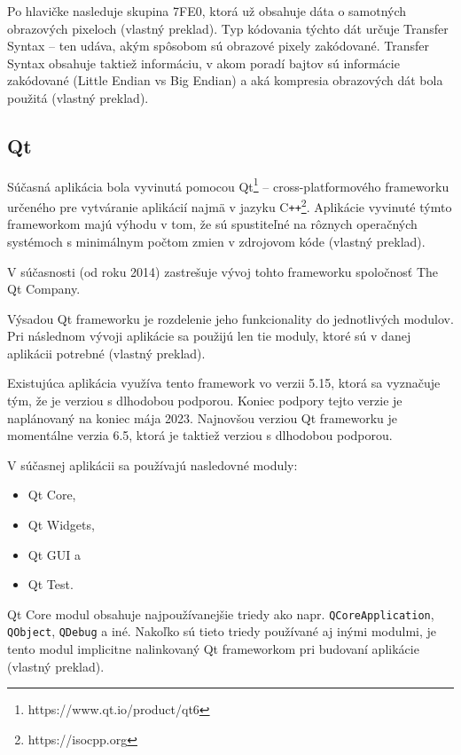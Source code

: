 Po hlavičke nasleduje skupina 7FE0, ktorá už obsahuje dáta o samotných obrazových pixeloch \cite{Varma_2012} (vlastný preklad). Typ kódovania týchto dát určuje Transfer Syntax -- ten udáva, akým spôsobom sú obrazové pixely zakódované. Transfer Syntax obsahuje taktiež informáciu, v akom poradí bajtov sú informácie zakódované (Little Endian vs Big Endian) a aká kompresia obrazových dát bola použitá \cite{dicom_transfer_syntax} (vlastný preklad).

\subsection {Qt}
Súčasná aplikácia bola vyvinutá pomocou Qt\footnote{https://www.qt.io/product/qt6} -- cross-platformového frameworku určeného pre vytváranie aplikácií najmä v jazyku C\texttt{++}\footnote{https://isocpp.org}. Aplikácie vyvinuté týmto frameworkom majú výhodu v tom, že sú spustiteľné na rôznych operačných systémoch s minimálnym počtom zmien v zdrojovom kóde \cite{qt_description} (vlastný preklad).

V súčasnosti (od roku 2014) zastrešuje vývoj tohto frameworku spoločnosť The Qt Company.

Výsadou Qt frameworku je rozdelenie jeho funkcionality do jednotlivých modulov. Pri následnom vývoji aplikácie sa použijú len tie moduly, ktoré \newline sú v danej aplikácii potrebné \cite{qt_description} (vlastný preklad).

Existujúca aplikácia využíva tento framework vo verzii 5.15, ktorá sa vyznačuje tým, že je verziou s dlhodobou podporou. Koniec podpory tejto verzie je naplánovaný na koniec mája 2023. Najnovšou verziou Qt frameworku je momentálne verzia 6.5, ktorá je taktiež verziou s dlhodobou podporou.

V súčasnej aplikácii sa používajú nasledovné moduly: 
\begin{itemize}
\item {Qt Core,}
\item {Qt Widgets,}
\item {Qt GUI a}
\item {Qt Test.}
\end{itemize}

Qt Core modul obsahuje najpoužívanejšie triedy ako napr. \texttt{QCoreApplication}, \texttt{QObject}, \texttt{QDebug} a iné. Nakoľko sú tieto triedy používané aj inými modulmi, je tento modul implicitne nalinkovaný Qt frameworkom pri budovaní aplikácie \cite{qtcore_description} (vlastný preklad).

